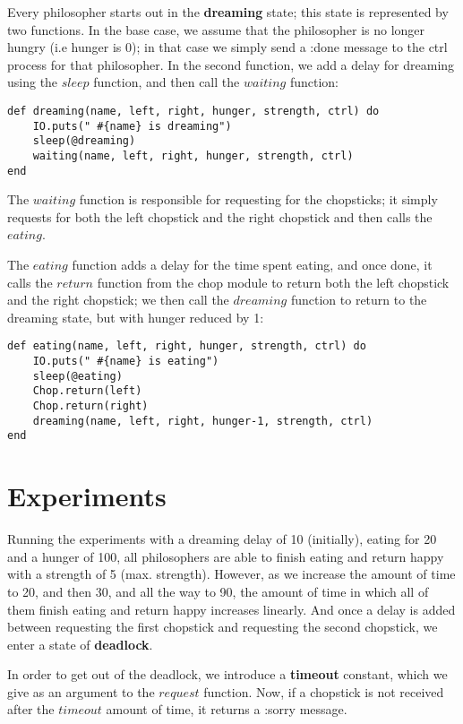 \documentclass[a4paper,11pt]{article}
\begin{document}
Every philosopher starts out in the \textbf{dreaming} state; this state is represented by two functions. In the base case, we assume that the philosopher is no longer hungry (i.e hunger is 0); in that case we simply send a :done message to the ctrl process for that philosopher. In the second function, we add a delay for dreaming using the $sleep$ function, and then call the $waiting$ function:
\begin{verbatim}
def dreaming(name, left, right, hunger, strength, ctrl) do
    IO.puts(" #{name} is dreaming")
    sleep(@dreaming)
    waiting(name, left, right, hunger, strength, ctrl)
end
\end{verbatim}
The $waiting$ function is responsible for requesting for the chopsticks; it simply requests for both the left chopstick and the right chopstick and then calls the $eating$.

The $eating$ function adds a delay for the time spent eating, and once done, it calls the $return$ function from the chop module to return both the left chopstick and the right chopstick; we then call the $dreaming$ function to return to the dreaming state, but with hunger reduced by 1:
\begin{verbatim}
def eating(name, left, right, hunger, strength, ctrl) do
    IO.puts(" #{name} is eating")
    sleep(@eating)
    Chop.return(left)
    Chop.return(right)
    dreaming(name, left, right, hunger-1, strength, ctrl)
end
\end{verbatim}


\section*{Experiments}
Running the experiments with a dreaming delay of 10 (initially), eating for 20 and a hunger of 100, all philosophers are able to finish eating and return happy with a strength of 5 (max. strength). However, as we increase the amount of time to 20, and then 30, and all the way to 90, the amount of time in which all of them finish eating and return happy increases linearly. And once a delay is added between requesting the first chopstick and requesting the second chopstick, we enter a state of \textbf{deadlock}.

In order to get out of the deadlock, we introduce a \textbf{timeout} constant, which we give as an argument to the $request$ function. Now, if a chopstick is not received after the $timeout$ amount of time, it returns a :sorry message.
\end{document}
